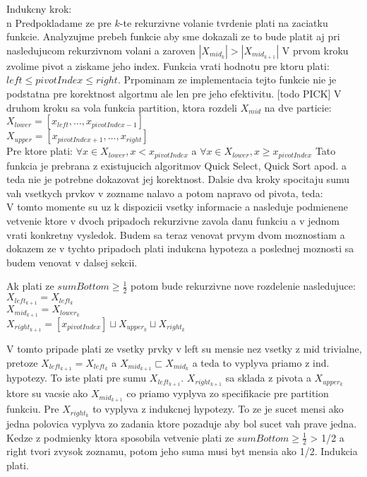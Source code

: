 \documentclass[paper=a4, fontsize=11pt]{scrartcl} %
\numberwithin{equation}{section} %
\numberwithin{figure}{section} %
\numberwithin{table}{section} %
\begin{document}
Indukcny krok:\\n
Predpokladame ze pre $k$-te rekurzivne volanie tvrdenie plati na zaciatku funkcie. Analyzujme prebeh funkcie aby sme dokazali ze to bude platit aj pri nasledujucom rekurzivnom volani a zaroven $|X_{mid_k}| > |X_{mid_{k+1}}| $
V prvom kroku zvolime pivot a ziskame jeho index. Funkcia vrati hodnotu pre ktoru plati: $left \leq pivotIndex \leq right$. Prpominam ze implementacia tejto funkcie nie je podstatna pre korektnost algortmu ale len pre jeho efektivitu. [todo PICK] V druhom kroku sa vola funkcia partition, ktora rozdeli $X_{mid}$ na dve particie:\\
$X_{lower} = [x_{left}, \dots, x_{pivotIndex-1}]$ \\
$X_{upper} = [x_{pivotIndex+1}, \dots, x_{right}]$ \\
Pre ktore plati:
$\forall x \in X_{lower}, x < x_{pivotIndex}$ a $\forall x \in X_{lower}, x \geq x_{pivotIndex}$
Tato funkcia je prebrana z existujucich algoritmov Quick Select, Quick Sort apod. a teda nie je potrebne dokazovat jej korektnost.
Dalsie dva kroky spocitaju sumu vah vsetkych prvkov v zozname nalavo a potom napravo od pivota, teda: \\

V tomto momente su uz k dispozicii vsetky informacie a nasleduje podmienene vetvenie ktore v dvoch pripadoch rekurzivne zavola danu funkciu a v jednom vrati konkretny vysledok. Budem sa teraz venovat prvym dvom moznostiam a dokazem ze v tychto pripadoch plati indukcna hypoteza a poslednej moznosti sa budem venovat v dalsej sekcii.

Ak plati ze $sumBottom \geq \frac{1}{2}$ potom bude rekurzivne nove rozdelenie nasledujuce: \\
$X_{left_{k+1}} = X_{left_k}$ \\
$X_{mid_{k+1}} = X_{lower_k}$\\
$X_{right_{k+1}} = [x_{pivotIndex}] \sqcup X_{upper_k} \sqcup X_{right_k}$

V tomto pripade plati ze vsetky prvky v left su mensie nez vsetky z mid trivialne, pretoze $X_{left_{k+1}} = X_{left_k}$ a $X_{mid_{k+1}} \sqsubset X_{mid_{k}}$ a teda to vyplyva priamo z ind. hypotezy. To iste plati pre sumu $X_{left_{k+1}}$.
$X_{right_{k+1}}$ sa sklada z pivota a $X_{upper_k}$ ktore su vacsie ako $X_{mid_{k+1}}$ co priamo vyplyva zo specifikacie pre partition funkciu. Pre $X_{right_k}$ to vyplyva z indukcnej hypotezy.
To ze je sucet mensi ako jedna polovica vyplyva zo zadania ktore pozaduje aby bol sucet vah prave jedna. Kedze z podmienky ktora sposobila vetvenie plati ze $sumBottom \geq \frac{1}{2}$ > 1/2 a right tvori zvysok zoznamu, potom jeho suma musi byt mensia ako 1/2. Indukcia plati.
\end{document}
